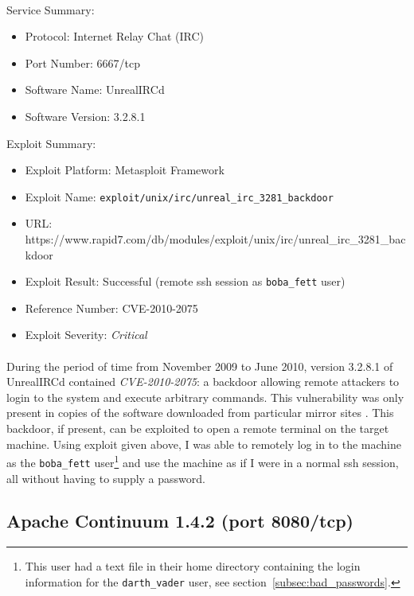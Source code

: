 \documentclass{article}
\begin{document}
\paragraph{}
Service Summary:
\begin{itemize}
	\item Protocol: Internet Relay Chat (IRC)
	\item Port Number: 6667/tcp
	\item Software Name: UnrealIRCd
	\item Software Version: 3.2.8.1
\end{itemize}
Exploit Summary:
\begin{itemize}
	\item Exploit Platform: Metasploit Framework
	\item Exploit Name: \texttt{exploit/unix/irc/unreal\_irc\_3281\_backdoor}
	\item URL: https://www.rapid7.com/db/modules/exploit/unix/irc/unreal\_irc\_3281\_backdoor
	\item Exploit Result: Successful (remote ssh session as \texttt{boba\_fett} user)
	\item Reference Number: CVE-2010-2075
	\item Exploit Severity: \emph{Critical}
\end{itemize}

\paragraph{}
During the period of time from November 2009 to June 2010, version 3.2.8.1 of UnrealIRCd contained \emph{CVE-2010-2075}: a backdoor allowing remote attackers to login to the system and execute arbitrary commands.
This vulnerability was only present in copies of the software downloaded from particular mirror sites \parencite{mitre20102075}.
This backdoor, if present, can be exploited to open a remote terminal on the target machine.
Using exploit given above, I was able to remotely log in to the machine as the \texttt{boba\_fett} user\footnote{This user had a text file in their home directory containing the login information for the \texttt{darth\_vader} user, see section~\ref{subsec:bad_passwords}.} and use the machine as if I were in a normal ssh session, all without having to supply a password.

\subsection{Apache Continuum 1.4.2 (port 8080/tcp)}
\label{subsec:apache_continuum}
\end{document}
